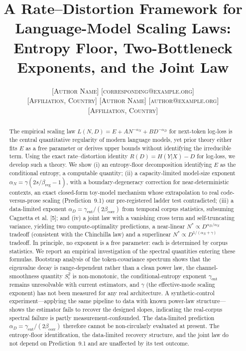 \documentclass[12pt]{article}
\title{A Rate--Distortion Framework for Language-Model Scaling Laws:
Entropy Floor, Two-Bottleneck Exponents, and the Joint Law}
\author{%
  \name \textsc{[Author Name]} \email \textsc{[corresponding@example.org]}\\
  \addr \textsc{[Affiliation, Country]}
  \AND
  \name \textsc{[Author Name]} \email \textsc{[author@example.org]}\\
  \addr \textsc{[Affiliation, Country]}
}
\theoremstyle{remark}
\begin{document}
\doublespacing


\maketitle

\begin{abstract}%
The empirical scaling law
$L(N,D) = E + A N^{-\alpha_N} + B D^{-\alpha_D}$ for next-token log-loss is
the central quantitative regularity of modern language models, yet prior
theory either fits $E$ as a free parameter or derives upper bounds without
identifying the irreducible term. Using
the exact rate--distortion identity $R(D)=H(Y|X)-D$ for log-loss, we develop
such a theory. We show (i) an entropy-floor decomposition identifying $E$ as
the conditional entropy, a computable quantity; (ii) a capacity-limited
model-size exponent $\alpha_N=\gamma(2s/\beta_{\mathrm{reg}}-1)$, with a
boundary-degeneracy correction for near-deterministic contexts, an exact
closed-form toy-model mechanism whose extrapolation to real
code-versus-prose scaling (Prediction~9.1) our
pre-registered ladder test contradicted; (iii) a data-limited exponent
$\alpha_D=\gamma_{\mathrm{ent}}/(2\beta_{\mathrm{corr}})$ from temporal corpus
statistics, subsuming Cagnetta et al. [5]; and (iv) a joint law with a vanishing
cross term and self-truncating variance, yielding two compute-optimality
predictions, a near-linear $N^*\propto D^{\alpha_D/\alpha_N}$ tradeoff
(consistent with the Chinchilla law) and a superlinear
$N^*\propto D^{1/(\alpha_N+\gamma)}$ tradeoff. In principle, no exponent is a
free parameter: each is determined by corpus statistics. We report an empirical
investigation of the spectral quantities entering these formulas. Bootstrap
analysis of the token-covariance spectrum shows that the eigenvalue decay is
range-dependent rather than a clean power law, the channel-smoothness quantity
$S_i^2$ is non-monotonic, the conditional-entropy exponent $\gamma_{\mathrm{ent}}$
remains unresolvable with current estimators, and $\gamma$ (the effective-mode
scaling exponent) has not been measured for any real architecture. A
synthetic-control experiment---applying the same pipeline to data with known
power-law structure---shows the estimator fails to recover the designed
slopes, indicating the real-corpus spectral failure is partly
measurement-confounded. The data-limited prediction
$\alpha_D=\gamma_{\mathrm{ent}}/(2\beta_{\mathrm{corr}})$ therefore cannot be
non-circularly evaluated at present. The entropy-floor identification, the
data-limited recovery structure, and the joint law do not depend on
Prediction~9.1 and are unaffected by its test outcome.
\end{abstract}
\end{document}
